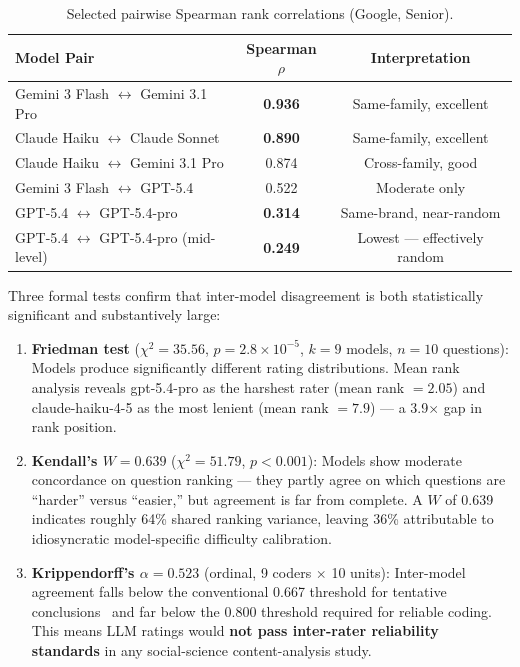 \documentclass{article}
\begin{document}
\begin{table}[h]
\caption{Selected pairwise Spearman rank correlations (Google, Senior).}
\label{tab:spearman}
\centering
\begin{tabular}{lcc}
\toprule
\textbf{Model Pair} & \textbf{Spearman $\rho$} & \textbf{Interpretation} \\
\midrule
Gemini 3 Flash $\leftrightarrow$ Gemini 3.1 Pro & \textbf{0.936} & Same-family, excellent \\
Claude Haiku $\leftrightarrow$ Claude Sonnet & \textbf{0.890} & Same-family, excellent \\
Claude Haiku $\leftrightarrow$ Gemini 3.1 Pro & 0.874 & Cross-family, good \\
Gemini 3 Flash $\leftrightarrow$ GPT-5.4 & 0.522 & Moderate only \\
GPT-5.4 $\leftrightarrow$ GPT-5.4-pro & \textbf{0.314} & Same-brand, near-random \\
GPT-5.4 $\leftrightarrow$ GPT-5.4-pro (mid-level) & \textbf{0.249} & Lowest --- effectively random \\
\bottomrule
\end{tabular}
\end{table}

Three formal tests confirm that inter-model disagreement is both statistically significant and substantively large:
\begin{enumerate}
  \item \textbf{Friedman test} ($\chi^2 = 35.56$, $p = 2.8\times10^{-5}$, $k=9$ models, $n=10$ questions): Models produce significantly different rating distributions. Mean rank analysis reveals gpt-5.4-pro as the harshest rater (mean rank $=2.05$) and claude-haiku-4-5 as the most lenient (mean rank $=7.9$) --- a 3.9$\times$ gap in rank position.
  \item \textbf{Kendall's $W = 0.639$} ($\chi^2 = 51.79$, $p<0.001$): Models show moderate concordance on question ranking --- they partly agree on which questions are ``harder'' versus ``easier,'' but agreement is far from complete. A $W$ of 0.639 indicates roughly 64\% shared ranking variance, leaving 36\% attributable to idiosyncratic model-specific difficulty calibration.
  \item \textbf{Krippendorff's $\alpha = 0.523$} (ordinal, 9 coders $\times$ 10 units): Inter-model agreement falls below the conventional 0.667 threshold for tentative conclusions~\cite{krippendorff2011} and far below the 0.800 threshold required for reliable coding. This means LLM ratings would \textbf{not pass inter-rater reliability standards} in any social-science content-analysis study.
\end{enumerate}
\end{document}
